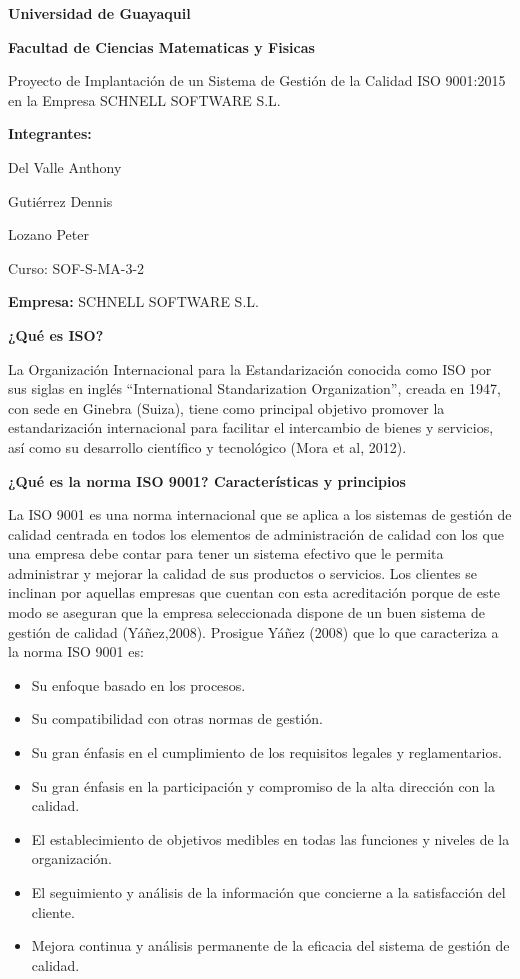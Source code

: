 \documentclass[10pt,a4paper]{article}
\begin{document}
\begin{center}
\textbf{Universidad de Guayaquil}

\textbf{Facultad de Ciencias Matematicas y Fisicas}

Proyecto de Implantación de un Sistema de Gestión de la Calidad ISO 9001:2015 en la Empresa SCHNELL SOFTWARE S.L.

\textbf{Integrantes:}

Del Valle Anthony

Gutiérrez Dennis

Lozano Peter

Curso: SOF-S-MA-3-2
\end{center}

\textbf{Empresa: }SCHNELL SOFTWARE S.L.

\textbf{¿Qué es ISO?}

La Organización Internacional para la Estandarización conocida como ISO por sus siglas en inglés “International Standarization Organization”, creada en 1947, con sede en Ginebra (Suiza), tiene como principal objetivo promover la estandarización internacional para facilitar el intercambio de bienes y servicios, así como su desarrollo científico y tecnológico (Mora et al, 2012).

\textbf{¿Qué es la norma ISO 9001? Características y principios}

La ISO 9001 es una norma internacional que se aplica a los sistemas de gestión de calidad centrada en todos los elementos de administración de calidad con los que una empresa debe contar para tener un sistema efectivo que le permita administrar y mejorar la calidad de sus productos o servicios. Los clientes se inclinan por aquellas empresas que cuentan con esta acreditación porque de este modo se aseguran que la empresa seleccionada dispone de un buen sistema de gestión de calidad (Yáñez,2008).
Prosigue Yáñez (2008) que lo que caracteriza a la norma ISO 9001 es:
\begin{itemize}
\item Su enfoque basado en los procesos.
\item Su compatibilidad con otras normas de gestión.
\item Su gran énfasis en el cumplimiento de los requisitos legales y reglamentarios.
\item Su gran énfasis en la participación y compromiso de la alta dirección con la calidad.
\item El establecimiento de objetivos medibles en todas las funciones y niveles de la organización.
\item El seguimiento y análisis de la información que concierne a la satisfacción del cliente.
\item Mejora continua y análisis permanente de la eficacia del sistema de gestión de calidad.
\end{itemize}
\end{document}

